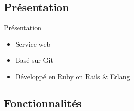 \begin{frame}
	\sectionpage
\end{frame}

\subsection{Présentation}
	\begin{frame}{Présentation}
		\begin{itemize}[<+->]
			\item Service web
			\item Basé sur Git
			\item Développé en Ruby on Rails \& Erlang
		\end{itemize}
	\end{frame}

\subsection{Fonctionnalités}
